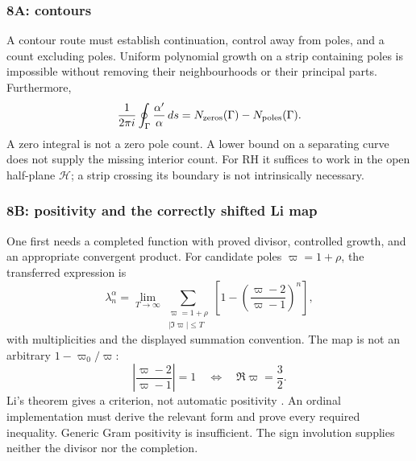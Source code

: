 \subsubsection{8A: contours}
\label{subsubsec:a12-contours}
A contour route must establish continuation, control away from poles,
and a count excluding poles. Uniform polynomial growth on a strip
containing poles is impossible without removing their neighbourhoods
or their principal parts. Furthermore,
\begin{equation}
\label{eq:a12-argument-principle}
\frac1{2\pi i}\oint_\Gamma\frac{\alpha'}{\alpha}\,ds
=N_{\rm zeros}(\Gamma)-N_{\rm poles}(\Gamma).
\end{equation}
A zero integral is not a zero pole count. A lower bound on a separating
curve does not supply the missing interior count.
For RH it suffices to work in the open half-plane $\mathcal H$;
a strip crossing its boundary is not intrinsically necessary.

\subsubsection{8B: positivity and the correctly shifted Li map}
\label{subsubsec:a12-Li}
One first needs a completed function with proved divisor, controlled
growth, and an appropriate convergent product.
For candidate poles $\varpi=1+\rho$, the transferred expression is
\begin{equation}
\label{eq:a12-Li}
\lambda_n^\alpha=
\lim_{T\to\infty}\sum_{\substack{\varpi=1+\rho\\|\Im\varpi|\le T}}
\left[1-\left(\frac{\varpi-2}{\varpi-1}\right)^n\right],
\end{equation}
with multiplicities and the displayed summation convention.
The map is not an arbitrary $1-\varpi_0/\varpi$:
\begin{equation}
\label{eq:a12-Li-circle}
\left|\frac{\varpi-2}{\varpi-1}\right|=1
\quad\Longleftrightarrow\quad\Re\varpi=\frac32.
\end{equation}
Li's theorem gives a criterion, not automatic positivity \cite{Li1997}.
An ordinal implementation must derive the relevant form and prove every
required inequality. Generic Gram positivity is insufficient.
The sign involution supplies neither the divisor nor the completion.


